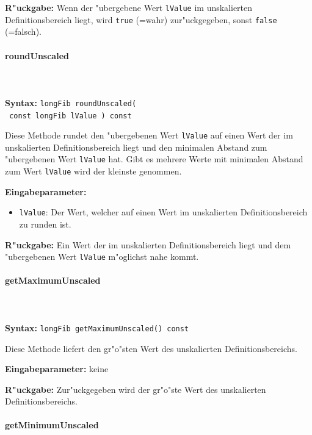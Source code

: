 \bigskip\noindent
\textbf{R"uckgabe:} Wenn der "ubergebene Wert \verb|lValue| im unskalierten Definitionsbereich liegt, wird \verb|true| (=wahr) zur"uckgegeben, sonst \verb|false| (=falsch).


\paragraph{roundUnscaled}

\ \\\\\noindent
\textbf{Syntax:} \verb|longFib roundUnscaled(| \\\verb| const longFib lValue ) const|

\bigskip\noindent
Diese Methode rundet den "ubergebenen Wert \verb|lValue| auf einen Wert der im unskalierten Definitionsbereich liegt und den minimalen Abstand zum "ubergebenen Wert \verb|lValue| hat. Gibt es mehrere Werte mit minimalen Abstand zum Wert \verb|lValue| wird der kleinste genommen.

\bigskip\noindent
\textbf{Eingabeparameter:}
\begin{itemize}
 \item \verb|lValue|: Der Wert, welcher auf einen Wert im unskalierten Definitionsbereich zu runden ist.
\end{itemize}

\bigskip\noindent
\textbf{R"uckgabe:} Ein Wert der im unskalierten Definitionsbereich liegt und dem "ubergebenen Wert \verb|lValue| m"oglichst nahe kommt.


\paragraph{getMaximumUnscaled}

\ \\\\\noindent
\textbf{Syntax:} \verb|longFib getMaximumUnscaled() const|

\bigskip\noindent
Diese Methode liefert den gr"o"sten Wert des unskalierten Definitionsbereichs.

\bigskip\noindent
\textbf{Eingabeparameter:} keine

\bigskip\noindent
\textbf{R"uckgabe:} Zur"uckgegeben wird der gr"o"ste Wert des unskalierten Definitionsbereichs.


\paragraph{getMinimumUnscaled}

